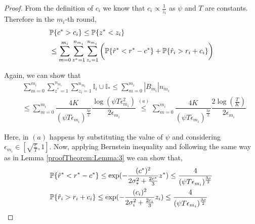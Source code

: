 \begin{proof}
From the definition of $c_i$ we know that $c_i\propto \frac{1}{z_i}$ as $\psi$ and $T$ are constants. Therefore in the $m_i$-th round,
\begin{align*}
&\mathbb{P}\lbrace c^{*} > c_i \rbrace
\leq  \mathbb{P}\lbrace  z^* < z_i  \rbrace \\
&\leq \sum_{m=0}^{m_i}\sum_{z^* =1}^{n_{m_i}}\sum_{z_i =1}^{n_{m_i}}\bigg(\mathbb{P}\lbrace \hat{r}^* < r^* - c^{*}\rbrace + \mathbb{P}\lbrace \hat{r}_i > r_i + c_i\rbrace\bigg)
\end{align*}

Again, we can show that
\begin{align*}
&\sum_{m=0}^{m_i}\sum_{z^* =1}^{n_{m_i}}\sum_{z_i =1}^{n_{m_i}}\mathbb{I}_{i}\cup\mathbb{I}_{*} \leq \sum_{m=0}^{m_i}|B_{m_i}|n_{m_i} \\
&\leq \sum_{m=0}^{m_i}\dfrac{4K}{(\psi T \epsilon_{m_i})^{\frac{3\rho}{2}}}\dfrac{\log{(\psi T\epsilon_{m_{i}}^{2})}}{2\epsilon_{m_{i}}} 
\overset{(a)}{\leq} \sum_{m=0}^{m_i}\dfrac{4K}{(\psi T \epsilon_{m_i})^{\frac{3\rho}{2}}}\dfrac{2\log(\frac{T}{K})}{2\epsilon_{m_i}}
\end{align*}

Here, in $(a)$ happens by substituting the value of $\psi$ and considering $\epsilon_{m_i}\in [\sqrt{\frac{e}{T}},1]$. Now, applying Bernstein inequality and following the same way as in Lemma \ref{proofTheorem:Lemma:3} we can show that,
\begin{align*}
&\mathbb{P}\lbrace \hat{r}^* < r^* - c^{*}\rbrace \leq \exp(- \frac{(c^{*})^2}{2\sigma_*^2 + \frac{2 c^{*}}{3}} z^*)\leq \frac{4}{(\psi T\epsilon_{m_i})^{\frac{3\rho}{2}}} \\ 
&\mathbb{P}\lbrace \hat{r}_i > r_i + c_i\rbrace \leq \exp(- \frac{(c_{i})^2}{2\sigma_i^2 + \frac{2 c_{i}}{3}} z_i)\leq \frac{4}{(\psi T\epsilon_{m_i})^{\frac{3\rho}{2}}}
\end{align*}


\end{proof}
